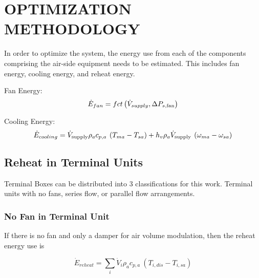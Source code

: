 %
%
%



\chapter{\uppercase{Optimization Methodology}}

In order to optimize the system, the energy use from each of the components comprising the air-side equipment needs to be estimated. This includes fan energy, cooling energy, and reheat energy.


Fan Energy:
\begin{equation} \label{eq:FanEqnergy} 
\dot E_{fan} = fct\left( {{{\dot V}_{supply}},\Delta {P_{s,{\rm{fan}}}}} \right)
\end{equation}

Cooling Energy:
\begin{equation} \label{eq:CoolingEnergy}
{\dot E_{cooling}} = {\dot V_{{\rm{supply}}}}\rho_a c_{p,a}\:\left( {{T_{ma}} - {T_{sa}}} \right) + h_v\rho_a{\dot V_{{\rm{supply}}}}\:\left( {{\omega _{ma}} - {\omega _{sa}}} \right)
\end{equation}

\section{Reheat in Terminal Units}

Terminal Boxes can be distributed into 3 classifications for this work. Terminal units with no fans, series flow, or parallel flow arrangements.

\subsection{No Fan in Terminal Unit}

If there is no fan and only a damper for air volume modulation, then the reheat energy use is 

\begin{equation} \label{eq:ReheatEnergy}
{\dot E_{reheat}} = \sum\limits_i {{{\dot V}_i}\rho_a c_{p,a}\:\left( {{T_{i,dis}} - {T_{i,sa}}} \right)} 
\end{equation}

